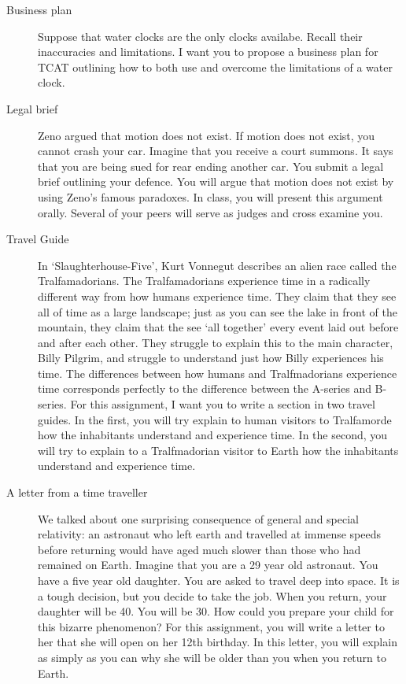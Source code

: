 \documentclass[oneside, 10pt]{article}
\begin{document}
\begin{description}
\item [Business plan] Suppose that water clocks are the only clocks availabe.  Recall their inaccuracies and limitations. I want  you to propose a business plan for TCAT outlining how to both use and overcome the limitations of a water clock. 

\item [Legal brief] Zeno argued that motion does not exist. If motion does not exist, you cannot crash your car. Imagine that you receive a court summons. It says that you are being sued for rear ending another car. You submit a legal brief outlining your defence. You will argue that motion does not exist by using Zeno's famous paradoxes. In class, you will present this argument orally. Several of your peers will serve as judges and cross examine you.  

\item [Travel Guide] In `Slaughterhouse-Five', Kurt Vonnegut describes an alien race called the Tralfamadorians. The Tralfamadorians experience time in a radically different way from how humans experience time. They claim that they see all of time as a large landscape; just as you can see the lake in front of the mountain, they claim that the see `all together' every event laid out before and after each other. They struggle to explain this to the main character, Billy Pilgrim, and struggle to understand just how Billy experiences his time. The differences between how humans and Tralfmadorians experience time corresponds perfectly to the difference between the A-series and B-series. For this assignment, I want you to write a section in two travel guides. In the first, you will try explain to human visitors to Tralfamorde how the inhabitants understand and experience time. In the second, you will try to explain to a Tralfmadorian visitor to Earth how the inhabitants understand and experience time. 

\item [A letter from a time traveller] We talked about one surprising consequence of general and special relativity: an astronaut who left earth and travelled at immense speeds before returning would have aged much slower than those who had remained on Earth. Imagine that you are a 29 year old astronaut. You have a five year old daughter. You are asked to travel deep into space. It is a tough decision, but you decide to take the job. When you return, your daughter will be 40. You will be 30. How could you prepare your child for this bizarre phenomenon? For this assignment, you will write a letter to her that she will open on her 12th birthday. In this letter, you will explain as simply as you can why she will be older than you when you return to Earth. 

\end{description}
\end{document}
